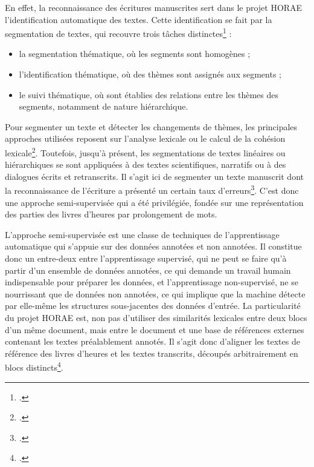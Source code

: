 \documentclass[a4paper,12pt,twoside]{book}
\begin{document}

	
	En effet, la reconnaissance des écritures manuscrites sert dans le projet HORAE l'identification automatique des textes. Cette identification se fait par la segmentation de textes, qui recouvre trois tâches distinctes\footcite[p. 26]{Seg_Livres_Heures} : 
	\begin{itemize}
	    \item la segmentation thématique, où les segments sont homogènes ;
	    \item l'identification thématique, où des thèmes sont assignés aux segments ;
	    \item le suivi thématique, où sont établies des relations entre les thèmes des segments, notamment de nature hiérarchique.
	\end{itemize}
	
	Pour segmenter un texte et détecter les changements de thèmes, les principales approches utilisées reposent sur l'analyse lexicale ou le calcul de la cohésion lexicale\footcite[p. 27]{Seg_Livres_Heures}. Toutefois, jusqu'à présent, les segmentations de textes linéaires ou hiérarchiques se sont appliquées à des textes scientifiques, narratifs ou à des dialogues écrits et retranscrits. Il s'agit ici de segmenter un texte manuscrit dont la reconnaissance de l'écriture a présenté un certain taux d'erreurs\footcite[p. 28]{Seg_Livres_Heures}. C'est donc une approche semi-supervisée qui a été privilégiée, fondée sur une représentation des parties des livres d'heures par prolongement de mots. 
	
	L'approche semi-supervisée est une classe de techniques de l'apprentissage automatique qui s'appuie sur des données annotées et non annotées. Il constitue donc un entre-deux entre l'apprentissage supervisé, qui ne peut se faire qu'à partir d'un ensemble de données annotées, ce qui demande un travail humain indispensable pour préparer les données, et l'apprentissage non-supervisé, ne se nourrissant que de données non annotées, ce qui implique que la machine détecte par elle-même les structures sous-jacentes des données d'entrée. La particularité du projet HORAE est, non pas d'utiliser des similarités lexicales entre deux blocs d'un même document, mais entre le document et une base de références externes contenant les textes préalablement annotés. Il s'agit donc d'aligner les textes de référence des livres d'heures et les textes transcrits, découpés arbitrairement en blocs distincts\footcite[p. 29]{Seg_Livres_Heures}. 
	
\end{document}
